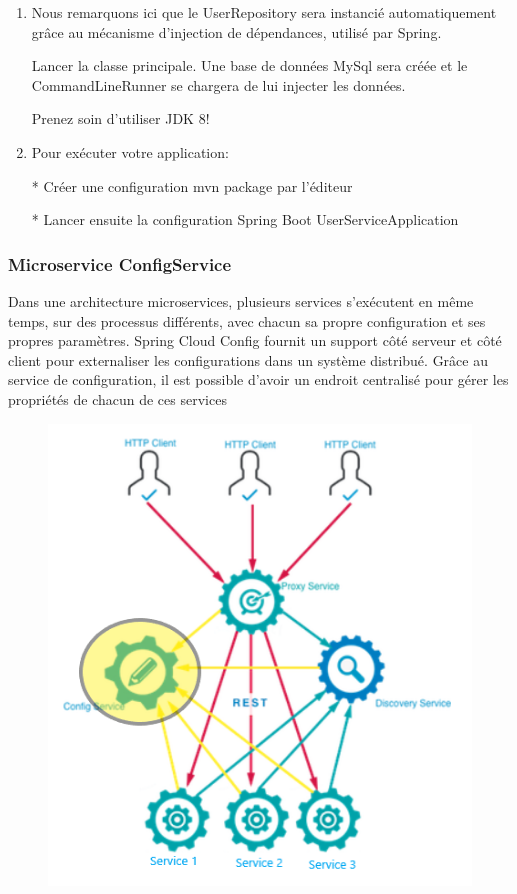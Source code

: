 \begin{enumerate}
\item Nous remarquons ici que le UserRepository sera instancié automatiquement grâce au mécanisme d'injection de dépendances, utilisé par Spring.

Lancer la classe principale. Une base de données MySql sera créée et le CommandLineRunner se chargera de lui injecter les données.


\begin{att}
	Prenez soin d'utiliser JDK 8!
\end{att}


\item Pour exécuter votre application:

  * Créer une configuration mvn package par l'éditeur  
    
        
    
  * Lancer ensuite la configuration Spring Boot UserServiceApplication  
  
    
\end{enumerate}
    
    
     
    
    
        
    \subsubsection{Microservice ConfigService}    
    Dans une architecture microservices, plusieurs services s'exécutent en même temps, sur des processus différents, avec chacun sa propre configuration et ses propres paramètres. Spring Cloud Config fournit un support côté serveur et côté client pour externaliser les configurations dans un système distribué. Grâce au service de configuration, il est possible d'avoir un endroit centralisé pour gérer les propriétés de chacun de ces services
    
    \begin{figure}[H]
    	\centering
    	\includegraphics[width=0.5\linewidth]{images/tp03}
    	\caption{}
    	\label{fig:tp03}
    \end{figure}
    
